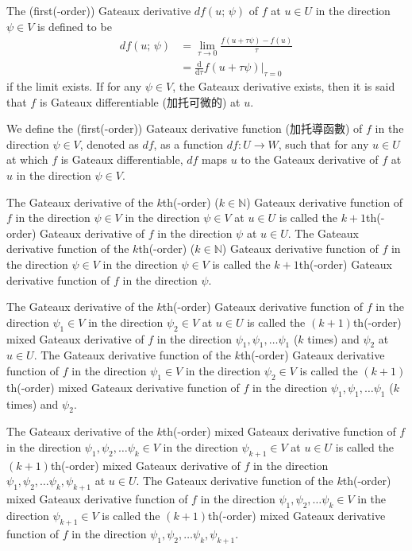 \documentclass[a4paper,12pt]{report}
\begin{document}
The (first(-order)) Gateaux derivative $df(u;\,\psi)$ of $f$ at $u\in U$ in the direction $\psi \in V$ is defined to be
\[\begin{aligned}
df(u;\,\psi) &= \lim_{\tau\to 0}\frac{f(u+\tau \psi)-f(u)}{\tau}\\
&= \frac{\mathrm{d}}{\mathrm{d}\tau}f(u+\tau \psi)\big\vert_{\tau =0}
\end{aligned}\]
if the limit exists. If for any $\psi \in V$, the Gateaux derivative exists, then it is said that $f$ is Gateaux differentiable (加托可微的) at $u$.

We define the (first(-order)) Gateaux derivative function (加托導函數) of $f$ in the direction $\psi \in V$, denoted as $df$, as a function $df\colon U\to W$, such that for any $u\in U$ at which $f$ is Gateaux differentiable, $df$ maps $u$ to the Gateaux derivative of $f$ at $u$ in the direction $\psi \in V$.

The Gateaux derivative of the $k$th(-order) ($k\in\mathbb{N}$) Gateaux derivative function of $f$ in the direction $\psi \in V$ in the direction $\psi \in V$ at $u\in U$ is called the $k+1$th(-order) Gateaux derivative of $f$ in the direction $\psi$ at $u\in U$. The Gateaux derivative function of the $k$th(-order) ($k\in\mathbb{N}$) Gateaux derivative function of $f$ in the direction $\psi \in V$ in the direction $\psi \in V$ is called the $k+1$th(-order) Gateaux derivative function of $f$ in the direction $\psi$.

The Gateaux derivative of the $k$th(-order) Gateaux derivative function of $f$ in the direction $\psi_1\in V$ in the direction $\psi_2\in V$ at $u\in U$ is called the $(k+1)$th(-order) mixed Gateaux derivative of $f$ in the direction $\psi_1,\psi_1,\dots \psi_1$ ($k$ times) and $\psi_2$ at $u\in U$. The Gateaux derivative function of the $k$th(-order) Gateaux derivative function of $f$ in the direction $\psi_1\in V$ in the direction $\psi_2\in V$ is called the $(k+1)$th(-order) mixed Gateaux derivative function of $f$ in the direction $\psi_1,\psi_1,\dots \psi_1$ ($k$ times) and $\psi_2$.

The Gateaux derivative of the $k$th(-order) mixed Gateaux derivative function of $f$ in the direction $\psi_1,\psi_2,\dots \psi_k\in V$ in the direction $\psi_{k+1}\in V$ at $u\in U$ is called the $(k+1)$th(-order) mixed Gateaux derivative of $f$ in the direction $\psi_1,\psi_2,\dots \psi_k,\psi_{k+1}$ at $u\in U$. The Gateaux derivative function of the $k$th(-order) mixed Gateaux derivative function of $f$ in the direction $\psi_1,\psi_2,\dots \psi_k\in V$ in the direction $\psi_{k+1}\in V$ is called the $(k+1)$th(-order) mixed Gateaux derivative function of $f$ in the direction $\psi_1,\psi_2,\dots \psi_k,\psi_{k+1}$.
\end{document}
